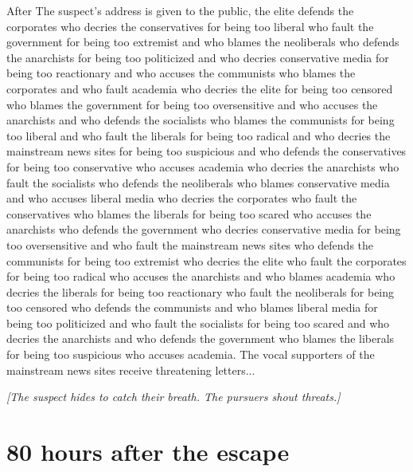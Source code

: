 \documentclass{report}
\begin{document}
After The suspect's address is given to the public, the elite defends the corporates who decries the conservatives for being too liberal who fault the government for being too extremist and who blames the neoliberals who defends the anarchists for being too politicized and who decries conservative media for being too reactionary and who accuses the communists who blames the corporates and who fault academia who decries the elite for being too censored who blames the government for being too oversensitive and who accuses the anarchists and who defends the socialists who blames the communists for being too liberal and who fault the liberals for being too radical and who decries the mainstream news sites for being too suspicious and who defends the conservatives for being too conservative who accuses academia who decries the anarchists who fault the socialists who defends the neoliberals who blames conservative media and who accuses liberal media who decries the corporates who fault the conservatives who blames the liberals for being too scared who accuses the anarchists who defends the government who decries conservative media for being too oversensitive and who fault the mainstream news sites who defends the communists for being too extremist who decries the elite who fault the corporates for being too radical who accuses the anarchists and who blames academia who decries the liberals for being too reactionary who fault the neoliberals for being too censored who defends the communists and who blames liberal media for being too politicized and who fault the socialists for being too scared and who decries the anarchists and who defends the government who blames the liberals for being too suspicious who accuses academia. The vocal supporters of the mainstream news sites receive threatening letters...

\textit{[The suspect hides to catch their breath. The pursuers shout threats.]}


\section*{80 \small{hours after the escape}}
\end{document}
